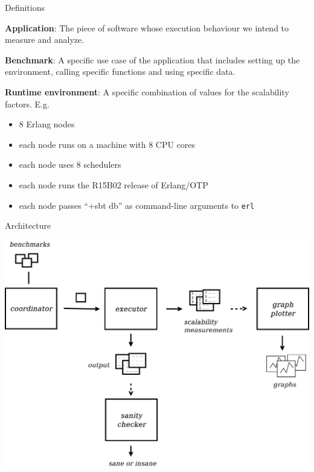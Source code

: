 \documentclass{beamer}
\begin{document}
\begin{frame}[t]{Definitions}

	\vspace{5pt}
	{\bf Application}: The \textcolor{burgundy}{piece of software} whose execution behaviour we intend to measure and analyze.

    \vspace{5pt}
	{\bf Benchmark}: A specific \textcolor{burgundy}{use case} of the \textcolor{burgundy}{application} that includes setting up the environment, calling specific functions and using specific data.

    \vspace{5pt}
	{\bf Runtime environment}: A specific combination of values for the \textcolor{burgundy}{scalability factors}.
        E.g. 
        \begin{itemize}
        \item 8 \textcolor{burgundy}{Erlang nodes}
        \item each node runs on a machine with 8 \textcolor{burgundy}{CPU cores}
        \item each node uses 8 \textcolor{burgundy}{schedulers}
        \item each node runs the R15B02 \textcolor{burgundy}{release of Erlang/OTP}
        \item each node passes ``+sbt db'' as \textcolor{burgundy}{command-line arguments to \texttt{erl}}
        \end{itemize}
\end{frame}

\begin{frame}[t]{Architecture}
	\begin{center}
		\includegraphics[width=0.8\linewidth]{figures/architecture.pdf}
	\end{center}
\end{frame}
\end{document}
